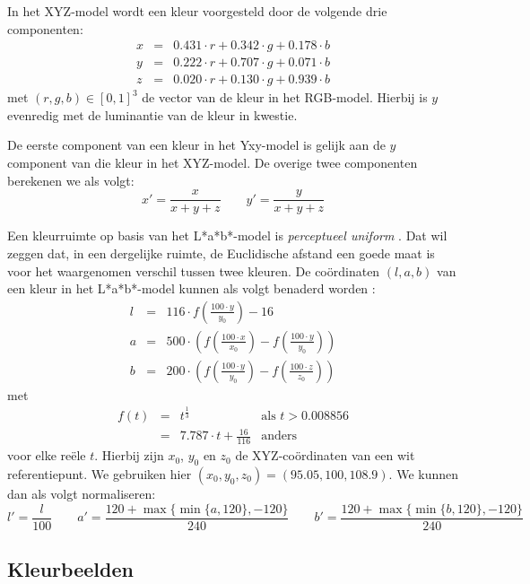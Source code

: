 In het XYZ-model wordt een kleur voorgesteld door de volgende drie componenten: 
$$
\begin{array}{rcl}
x & = & 0.431 \cdot r+0.342 \cdot g+0.178 \cdot b \\ y & = & 0.222 \cdot 
r+0.707 \cdot g+0.071 \cdot b \\ z & = & 0.020 \cdot r+0.130 \cdot g+0.939 
\cdot b
\end{array}
$$ met $(r,g,b) \in [0,1]^3$ de vector van de kleur in het RGB-model. Hierbij 
is $y$ evenredig met de luminantie van de kleur in kwestie. 

De eerste component van een kleur in het Yxy-model is gelijk aan de $y$ 
component van die kleur in het XYZ-model. De overige twee componenten berekenen 
we als volgt: $$ x' = \frac{x}{x+y+z} \qquad y' = \frac{y}{x+y+z} $$ 

Een kleurruimte op basis van het L*a*b*-model is \emph{perceptueel uniform} 
\cite{sharma:digital_color_imaging}. Dat wil zeggen dat, in een dergelijke 
ruimte, de Euclidische afstand een goede maat is voor het waargenomen verschil 
tussen twee kleuren. De co\"ordinaten $(l,a,b)$ van een kleur in het 
L*a*b*-model kunnen als volgt benaderd worden 
\cite{debaets:similariteitsmaten_voor_kleurbeelden, philips:beeldverwerking}: $$
\begin{array}{rcl}
l & = & 116 \cdot f(\frac{100 \cdot y}{y_0}) - 16 \\[5pt] a & = & 500 \cdot 
\left(f(\frac{100 \cdot x}{x_0}) - f(\frac{100 \cdot y}{y_0})\right) \\[5pt] b & = & 200 \cdot 
\left(f(\frac{100 \cdot y}{y_0}) - f(\frac{100 \cdot z}{z_0})\right)
\end{array}
$$ met $$
\begin{array}{rcll}
f(t) & = & t^\frac{1}{3} & \textrm{als } t > 0.008856 \\ & = & 7.787 \cdot t + 
\frac{16}{116} & \textrm{anders}
\end{array}
$$ voor elke re\"ele $t$. Hierbij zijn $x_0$, $y_0$ en $z_0$ de 
XYZ-co\"ordinaten van een wit referentiepunt. We gebruiken hier 
$(x_0,y_0,z_0)=(95.05,100,108.9)$.
We kunnen dan als volgt normaliseren: $$ l' = \frac{l}{100} \qquad a' = \frac{120 + 
\max\{\min\{a,120\},-120\}}{240} \qquad b' = \frac{120 + \max\{\min\{b,120\},-120\}}{240} $$


\subsection{Kleurbeelden}

